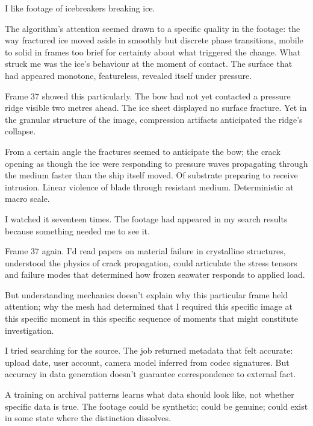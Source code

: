 I like footage of icebreakers breaking ice.

The algorithm's attention seemed drawn to a specific quality in the footage: the way fractured ice moved aside in smoothly but discrete phase transitions, mobile to solid in frames too brief for certainty about what triggered the change. What struck me was the ice's behaviour at the moment of contact. The surface that had appeared monotone, featureless, revealed itself under pressure.

Frame 37 showed this particularly. The bow had not yet contacted a pressure ridge visible two metres ahead. The ice sheet displayed no surface fracture. Yet in the granular structure of the image, compression artifacts anticipated the ridge's collapse.

From a certain angle the fractures seemed to anticipate the bow; the crack opening as though the ice were responding to pressure waves propagating through the medium faster than the ship itself moved. Of substrate preparing to receive intrusion. Linear violence of blade through resistant medium. Deterministic at macro scale.


I watched it seventeen times. The footage had appeared in my search results because something needed me to see it.

Frame 37 again. I'd read papers on material failure in crystalline structures, understood the physics of crack propagation, could articulate the stress tensors and failure modes that determined how frozen seawater responds to applied load.

But understanding mechanics doesn't explain why this particular frame held attention; why the mesh had determined that I required this specific image at this specific moment in this specific sequence of moments that might constitute investigation.

I tried searching for the source. The job returned metadata that felt accurate: upload date, user account, camera model inferred from codec signatures. But accuracy in data generation doesn't guarantee correspondence to external fact.

A training on archival patterns learns what data should look like, not whether specific data is true. The footage could be synthetic; could be genuine; could exist in some state where the distinction dissolves.

